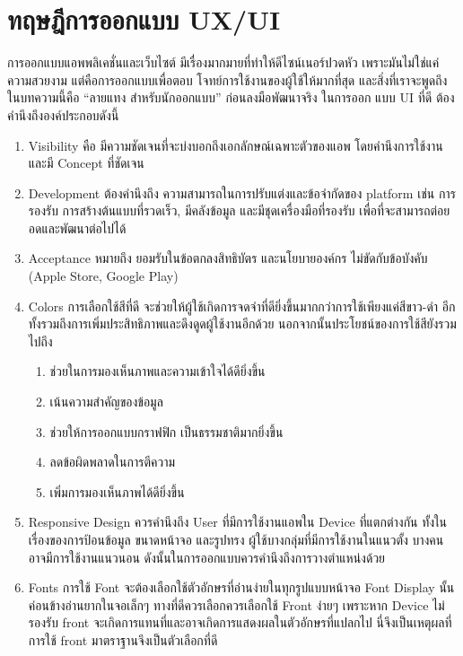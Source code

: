 \section{ทฤษฎีการออกแบบ UX/UI}
การออกแบบแอพพลิเคชั่นและเว็บไซต์ มีเรื่องมากมายที่ทำให้ดีไซน์เนอร์ปวดหัว เพราะมันไม่ใช่แค่ความสวยงาม แต่คือการออกแบบเพื่อตอบ
โจทย์การใช้งานของผู้ใช้ให้มากที่สุด และสิ่งที่เราจะพูดถึงในบทความนี้คือ “ลายแทง สำหรับนักออกแบบ” ก่อนลงมือพัฒนาจริง ในการออก
แบบ UI ที่ดี ต้องคำนึงถึงองค์ประกอบดังนี้
\begin{enumerate}
  \item Visibility คือ มีความชัดเจนที่จะบ่งบอกถึงเอกลักษณ์เฉพาะตัวของแอพ โดยคำนึงการใช้งาน และมี Concept ที่ชัดเจน
  \item Development ต้องคำนึงถึง ความสามารถในการปรับแต่งและข้อจำกัดของ platform เช่น การรองรับ การสร้างต้นแบบที่รวดเร็ว, มีคลังข้อมูล และมีชุดเครื่องมือที่รองรับ เพื่อที่จะสามารถต่อยอดและพัฒนาต่อไปได้
  \item Acceptance หมายถึง ยอมรับในข้อตกลงสิทธิบัตร และนโยบายองค์กร ไม่ขัดกับข้อบังคับ (Apple Store, Google Play)
  \item Colors การเลือกใช้สีที่ดี จะช่วยให้ผู้ใช้เกิดการจดจำที่ดียิ่งขึ้นมากกว่าการใช้เพียงแค่สีขาว-ดำ อีกทั้งรวมถึงการเพิ่มประสิทธิภาพและดึงดูดผู้ใช้งานอีกด้วย นอกจากนั้นประโยชน์ของการใช้สียังรวมไปถึง
        \begin{enumerate}
          \item ช่วยในการมองเห็นภาพและความเข้าใจได้ดียิ่งขึ้น
          \item เน้นความสำคัญของข้อมูล
          \item ช่วยให้การออกแบบกราฟฟิก เป็นธรรมชาติมากยิ่งขึ้น
          \item ลดข้อผิดพลาดในการตีความ
          \item เพิ่มการมองเห็นภาพได้ดียิ่งขึ้น
        \end{enumerate}
  \item Responsive Design ควรคำนึงถึง User ที่มีการใช้งานแอพใน Device ที่แตกต่างกัน ทั้งในเรื่องของการป้อนข้อมูล ขนาดหน้าจอ และรูปทรง ผู้ใช้บางกลุ่มที่มีการใช้งานในแนวตั้ง บางคนอาจมีการใช้งานแนวนอน ดังนั้นในการออกแบบควรคำนึงถึงการวางตำแหน่งด้วย
  \item Fonts การใช้ Font จะต้องเลือกใช้ตัวอักษรที่อ่านง่ายในทุกรูปแบบหน้าจอ  Font Display นั้นค่อนข้างอ่านยากในจอเล็กๆ ทางที่ดีควรเลือกควรเลือกใช้ Front ง่ายๆ เพราะหาก Device ไม่รองรับ front จะเกิดการแทนที่และอาจเกิดการแสดงผลในตัวอักษรที่แปลกไป นี่จึงเป็นเหตุผลที่การใช้ front มาตราฐานจึงเป็นตัวเลือกที่ดี
\end{enumerate}

